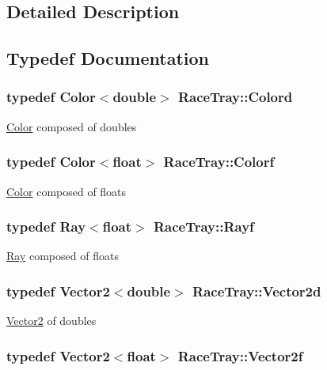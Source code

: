 \subsection{Detailed Description}


\subsection{Typedef Documentation}
\hypertarget{group___math_gaf823d8c8bfe82b4114d3d71143b95d63}{
\subsubsection[{Colord}]{\setlength{\rightskip}{0pt plus 5cm}typedef Color$<$double$>$ {\bf Race\-Tray\-::\-Colord}}}\label{group___math_gaf823d8c8bfe82b4114d3d71143b95d63}
\hyperlink{class_race_tray_1_1_color}{Color} composed of doubles \hypertarget{group___math_gaceb269408b1acca232f701aa53d02857}{
\subsubsection[{Colorf}]{\setlength{\rightskip}{0pt plus 5cm}typedef Color$<$float$>$ {\bf Race\-Tray\-::\-Colorf}}}\label{group___math_gaceb269408b1acca232f701aa53d02857}
\hyperlink{class_race_tray_1_1_color}{Color} composed of floats \hypertarget{group___math_ga5fdea6c2a8db84c0cc5b7aaeeb48b17a}{
\subsubsection[{Rayf}]{\setlength{\rightskip}{0pt plus 5cm}typedef Ray$<$float$>$ {\bf Race\-Tray\-::\-Rayf}}}\label{group___math_ga5fdea6c2a8db84c0cc5b7aaeeb48b17a}
\hyperlink{class_race_tray_1_1_ray}{Ray} composed of floats \hypertarget{group___math_ga5373c51213c640389207bc20d53938d2}{
\subsubsection[{Vector2d}]{\setlength{\rightskip}{0pt plus 5cm}typedef Vector2$<$double$>$ {\bf Race\-Tray\-::\-Vector2d}}}\label{group___math_ga5373c51213c640389207bc20d53938d2}
\hyperlink{class_race_tray_1_1_vector2}{Vector2} of doubles \hypertarget{group___math_gabf7d0f12bb01ae49c6f6beac2beead58}{
\subsubsection[{Vector2f}]{\setlength{\rightskip}{0pt plus 5cm}typedef Vector2$<$float$>$ {\bf Race\-Tray\-::\-Vector2f}}}\label{group___math_gabf7d0f12bb01ae49c6f6beac2beead58}
